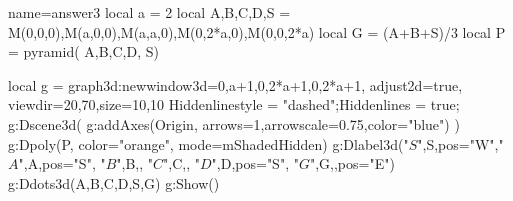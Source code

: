 \documentclass{standalone}
\begin{document}
\begin{luadraw}{name=answer3}
local a = 2
local A,B,C,D,S = M(0,0,0),M(a,0,0),M(a,a,0),M(0,2*a,0),M(0,0,2*a)
local G = (A+B+S)/3
local P = pyramid( {A,B,C,D}, S)

local g = graph3d:new{window3d={0,a+1,0,2*a+1,0,2*a+1}, adjust2d=true, viewdir={20,70},size={10,10}}
Hiddenlinestyle = "dashed";Hiddenlines = true;
g:Dscene3d(
g:addAxes(Origin, {arrows=1,arrowscale=0.75,color="blue"})
    )
g:Dpoly(P, {color="orange", mode=mShadedHidden})
 g:Dlabel3d("$S$",S,{pos="W"},"$A$",A,{pos="S"}, "$B$",B,{}, "$C$",C,{}, "$D$",D,{pos="S"}, "$G$",G,{},{pos="E"})
g:Ddots3d({A,B,C,D,S,G})
g:Show()
\end{luadraw}
\end{document}
